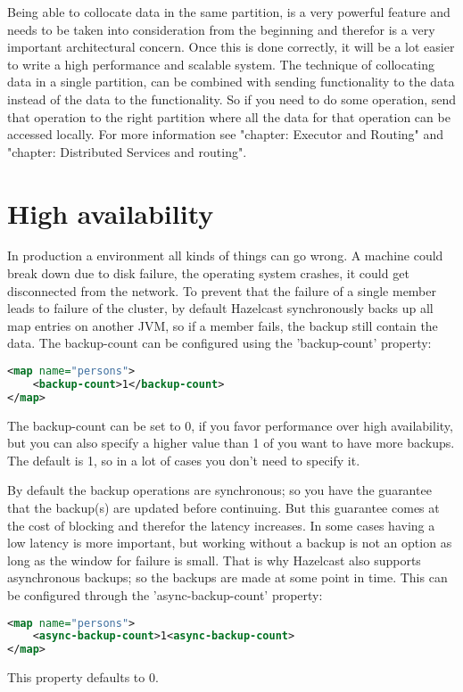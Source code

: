 Being able to collocate data in the same partition, is a very powerful feature and needs to be taken into consideration from the beginning and therefor is a very important architectural concern. Once this is done correctly, it will be a lot easier to write a high performance and scalable system. The technique of collocating data in a single partition, can be combined with sending functionality to the data instead of the data to the functionality. So if you need to do some operation, send that operation to the right partition where all the data for that operation can be accessed locally. For more information see "chapter: Executor and Routing" and "chapter: Distributed Services and routing".

\section{High availability}
In production a environment all kinds of things can go wrong. A machine could break down due to disk failure, the operating system crashes, it could get disconnected from the network. To prevent that the failure of a single member leads to failure of the cluster, by default Hazelcast synchronously backs up all map entries on another JVM, so if a member fails, the backup still contain the data. The backup-count can be configured using the 'backup-count' property:
\begin{lstlisting}[language=xml]
<map name="persons"> 
    <backup-count>1</backup-count>
</map> 
\end{lstlisting}
The backup-count can be set to 0, if you favor performance over high availability, but you can also specify a higher value than 1 of you want to have more backups. The default is 1, so in a lot of cases you don't need to specify it.

By default the backup operations are synchronous; so you have the guarantee that the backup(s) are updated before continuing. But this guarantee comes at the cost of blocking and therefor the latency increases. In some cases having a low latency is more important, but working without a backup is not an option as long as the window for failure is small. That is why Hazelcast also supports asynchronous backups; so the backups are made at some point in time. This can be configured through the 'async-backup-count' property:
\begin{lstlisting}[language=xml]
<map name="persons"> 
    <async-backup-count>1<async-backup-count>
</map> 
\end{lstlisting}
This property defaults to 0. 

